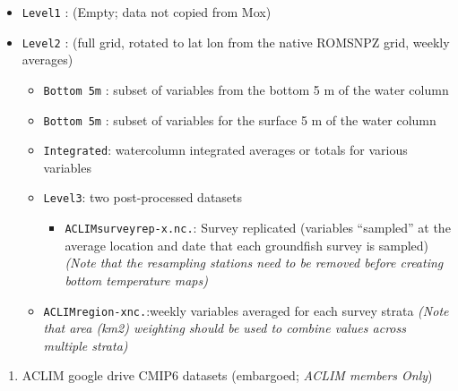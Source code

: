 \documentclass[
]{article}
\providecommand{\tightlist}{%
  \setlength{\itemsep}{0pt}\setlength{\parskip}{0pt}}
\begin{document}
\begin{itemize}
\tightlist
\item
  \texttt{Level1} : (Empty; data not copied from Mox)
\item
  \texttt{Level2} : (full grid, rotated to lat lon from the native
  ROMSNPZ grid, weekly averages)

  \begin{itemize}
  \tightlist
  \item
    \texttt{Bottom\ 5m} : subset of variables from the bottom 5 m of the
    water column
  \item
    \texttt{Bottom\ 5m} : subset of variables for the surface 5 m of the
    water column
  \item
    \texttt{Integrated}: watercolumn integrated averages or totals for
    various variables
  \item
    \texttt{Level3}: two post-processed datasets

    \begin{itemize}
    \tightlist
    \item
      \texttt{ACLIMsurveyrep-x.nc.}: Survey replicated (variables
      ``sampled'' at the average location and date that each groundfish
      survey is sampled)\emph{(Note that the resampling stations need to
      be removed before creating bottom temperature maps)}\\
    \end{itemize}
  \item
    \texttt{ACLIMregion-xnc.}:weekly variables averaged for each survey
    strata \emph{(Note that area (km2) weighting should be used to
    combine values across multiple strata)}
  \end{itemize}
\end{itemize}

\begin{enumerate}
\def\labelenumi{\arabic{enumi})}
\setcounter{enumi}{1}
\tightlist
\item
  ACLIM google drive CMIP6 datasets (embargoed; \emph{ACLIM members
  Only})
\end{enumerate}
\end{document}
